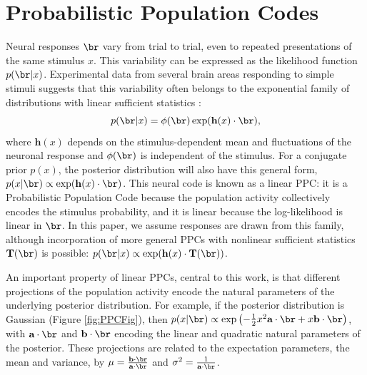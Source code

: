 \documentclass{article}
\begin{document}
\section{Probabilistic Population Codes}
\label{PPC}

Neural responses $\br$ vary from trial to trial, even to repeated presentations of the same stimulus $x$. This variability can be expressed as the likelihood function $p(\br|x)$. Experimental data from several brain areas responding to simple stimuli suggests that this variability often belongs to the exponential family of distributions with linear sufficient statistics \cite{ma2006bayesian, jazayeri2006optimal, beck2008probabilistic, beck2011marginalization, graf2011decoding}:
\begin{equation}
p(\br|x) = \phi(\br)\exp(\textbf{h}(x) \cdot \br),
\end{equation}
where $\textbf{h}(x)$ depends on the stimulus-dependent mean and fluctuations of the neuronal response and $\phi(\br)$ is independent of the stimulus. For a conjugate prior $p(x)$, the posterior distribution will also have this general form, $p(x|\br) \propto \exp(\textbf{h}(x) \cdot \br)$. This neural code is known as a linear PPC: it is a Probabilistic Population Code because the population activity collectively encodes the stimulus probability, and it is linear because the log-likelihood is linear in $\br$. In this paper, we assume responses are drawn from this family, although incorporation of more general PPCs with nonlinear sufficient statistics $\textbf{T}(\br)$ is possible: $p(\br|x) \propto \exp(\textbf{h}(x) \cdot \textbf{T}(\br))$.


An important property of linear PPCs, central to this work, is that different projections of the population activity encode the natural parameters of the underlying posterior distribution. For example, if the posterior distribution is Gaussian (Figure \ref{fig:PPCFig}), then
$p(x|\br) \propto \exp{\left(-\tfrac{1}{2}x^2\textbf{a}\cdot\br + x \textbf{b}\cdot\br\right)}$,
with $\textbf{a}\cdot\br$ and $\textbf{b}\cdot\br$ encoding the linear and quadratic natural parameters of the posterior. These projections are related to the expectation parameters, the mean and variance, by $\mu = \frac{\textbf{b}\cdot\br}{\textbf{a}\cdot\br}$ and $\sigma^2 = \frac{1}{\textbf{a}\cdot\br}$.
\end{document}
